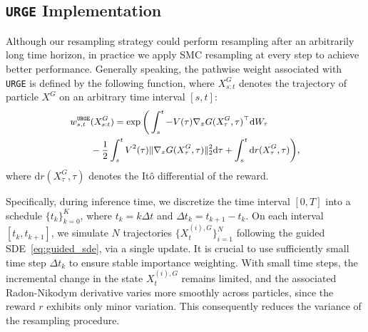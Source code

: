 \documentclass{article}
\theoremstyle{plain}
\theoremstyle{definition}
\theoremstyle{remark}
\newcommand{\dif}{{\mathrm{d}}}
\begin{document}
\subsection{\texttt{URGE} Implementation}
\label{sec:urge_implementation}

Although our resampling strategy could perform resampling after an arbitrarily long time horizon, in practice we apply SMC resampling at every step to achieve better performance. Generally speaking, the pathwise weight associated with \texttt{URGE} is defined by the following function, where \(X^{G}_{s:t}\) denotes the trajectory of particle \(X^{G}\) on an arbitrary time interval $[s, t]$:
\begin{equation}
    \small
    \begin{aligned}
        w^{\texttt{URGE}}_{s,t}&(X^G_{s:t}) = \exp\bigg(\int_s^t -V(\tau)\nabla_x G(X_\tau^G,\tau)^\top \dif W_\tau \\
        &- \frac{1}{2} \int_s^t V^2(\tau)\|\nabla_x G(X_\tau^G,\tau)\|_2^2\dif \tau + \int_s^t \dif r(X_\tau^G,\tau)\bigg),
    \end{aligned}
    \label{eq:URGEweight_pathwise}
\end{equation}
where $\dif r(X_\tau^G, \tau)$ denotes the It\^o differential of the reward.

Specifically, during inference time, we discretize the time interval $[0,T]$ into a schedule $\{t_k\}_{k=0}^{K}$, where $t_k = k \Delta t$ and $\Delta t_k = t_{k+1} - t_k$. On each interval $[t_k, t_{k+1}]$,  we simulate $N$ trajectories $\{X_t^{(i),G}\}_{i=1}^{N}$ following the guided SDE~\eqref{eq:guided_sde}, via a single update.
It is crucial to use sufficiently small time step $\Delta t_k$ to ensure stable importance weighting. With small time steps, the incremental change in the state $X^{(i),G}_t$ remains limited, and the associated Radon-Nikodym derivative varies more smoothly across particles, since the reward $r$ exhibits only minor variation. This consequently reduces the variance of the resampling procedure. 
\end{document}
